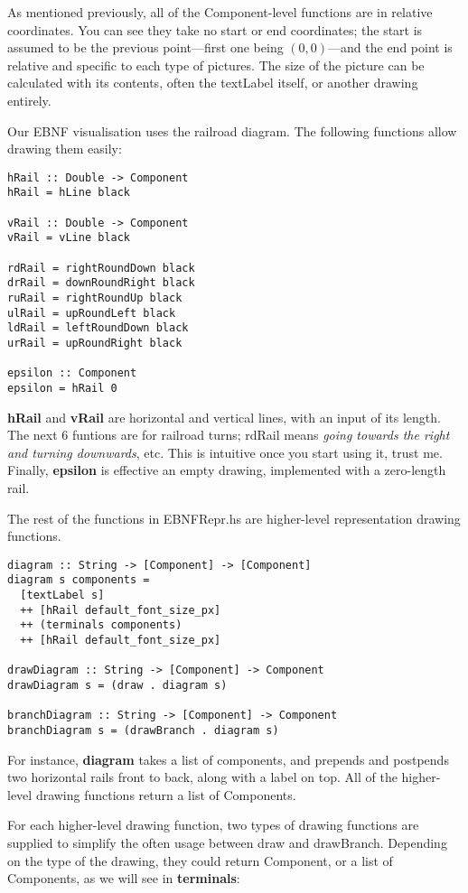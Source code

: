 \documentclass[a4paper]{article}
\begin{document}
As mentioned previously, all of the Component-level functions are in relative coordinates. You can see they take no start or end coordinates; the start is assumed to be the previous point---first one being $(0, 0)$---and the end point is relative and specific to each type of pictures. The size of the picture can be calculated with its contents, often the textLabel itself, or another drawing entirely.

Our EBNF visualisation uses the railroad diagram. The following functions allow drawing them easily:

\begin{verbatim}
hRail :: Double -> Component
hRail = hLine black

vRail :: Double -> Component
vRail = vLine black

rdRail = rightRoundDown black
drRail = downRoundRight black
ruRail = rightRoundUp black
ulRail = upRoundLeft black
ldRail = leftRoundDown black
urRail = upRoundRight black

epsilon :: Component
epsilon = hRail 0
\end{verbatim}

\textbf{hRail} and \textbf{vRail} are horizontal and vertical lines, with an input of its length. The next 6 funtions are for railroad turns; rdRail means {\em going towards the right and turning downwards}, etc. This is intuitive once you start using it, trust me. Finally, \textbf{epsilon} is effective an empty drawing, implemented with a zero-length rail.

The rest of the functions in EBNFRepr.hs are higher-level representation drawing functions.

\begin{verbatim}
diagram :: String -> [Component] -> [Component]
diagram s components =
  [textLabel s]
  ++ [hRail default_font_size_px]
  ++ (terminals components)
  ++ [hRail default_font_size_px]
  
drawDiagram :: String -> [Component] -> Component
drawDiagram s = (draw . diagram s)

branchDiagram :: String -> [Component] -> Component
branchDiagram s = (drawBranch . diagram s)
\end{verbatim}

For instance, \textbf{diagram} takes a list of components, and prepends and postpends two horizontal rails front to back, along with a label on top. All of the higher-level drawing functions return a list of Components.

For each higher-level drawing function, two types of drawing functions are supplied to simplify the often usage between draw and drawBranch. Depending on the type of the drawing, they could return Component, or a list of Components, as we will see in \textbf{terminals}:
\end{document}
